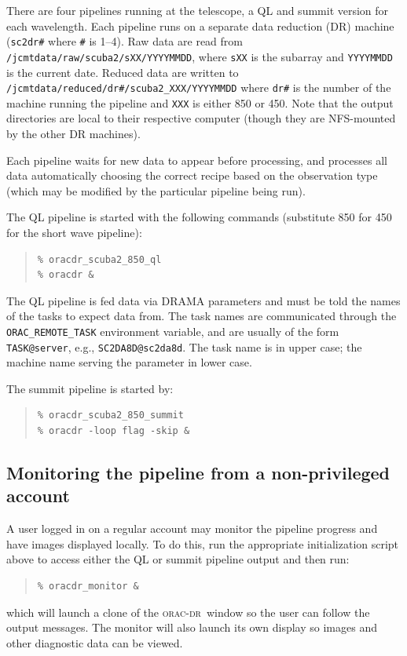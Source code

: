 \documentclass[twoside,11pt]{article}
\renewcommand{\_}{\texttt{\symbol{95}}}
\newenvironment{myquote}{\begin{quote}\begin{small}}{\end{small}\end{quote}}
\newcommand{\oracdr}{\textsc{orac-dr}}
\begin{document}
There are four pipelines running at the telescope, a QL and summit
version for each wavelength. Each pipeline runs on a separate data
reduction (DR) machine (\verb+sc2dr#+ where \verb+#+ is 1--4). Raw
data are read from \verb+/jcmtdata/raw/scuba2/sXX/YYYYMMDD+, where
\verb+sXX+ is the subarray and \verb+YYYYMMDD+ is the current
date. Reduced data are written to
\verb+/jcmtdata/reduced/dr#/scuba2_XXX/YYYYMMDD+ where \verb+dr#+ is
the number of the machine running the pipeline and \verb+XXX+ is
either 850 or 450. Note that the output directories are local to their
respective computer (though they are NFS-mounted by the other DR
machines).

Each pipeline waits for new data to appear before processing, and
processes all data automatically choosing the correct recipe based on
the observation type (which may be modified by the particular pipeline
being run).

The QL pipeline is started with the following commands (substitute 850
for 450 for the short wave pipeline):
\begin{myquote}
\begin{verbatim}
% oracdr_scuba2_850_ql
% oracdr &
\end{verbatim}
\end{myquote}

The QL pipeline is fed data via DRAMA parameters and must be told the
names of the tasks to expect data from. The task names are
communicated through the \verb+ORAC_REMOTE_TASK+ environment
variable, and are usually of the form \verb+TASK@server+, e.g.,
\verb+SC2DA8D@sc2da8d+. The task name is in upper case; the machine
name serving the parameter in lower case.

The summit pipeline is started by:
\begin{myquote}
\begin{verbatim}
% oracdr_scuba2_850_summit
% oracdr -loop flag -skip &
\end{verbatim}
\end{myquote}

\subsection{Monitoring the pipeline from a non-privileged account}

A user logged in on a regular account may monitor the pipeline
progress and have images displayed locally. To do this, run the
appropriate initialization script above to access either the QL or
summit pipeline output and then run:
\begin{myquote}
\begin{verbatim}
% oracdr_monitor &
\end{verbatim}
\end{myquote}
which will launch a clone of the \oracdr\ window so the user can follow
the output messages. The monitor will also launch its own display so
images and other diagnostic data can be viewed.
\end{document}
